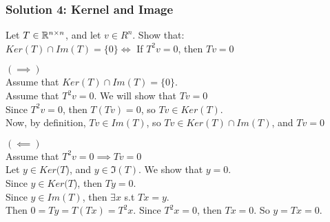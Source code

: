 \documentclass[table]{beamer}
\renewenvironment{enumerate}%
{\begin{list}{\arabic{enumi}.}%
      {\setlength{\leftmargin}{2.5em}%
       \setlength{\itemsep}{-\parsep}%
       \setlength{\topsep}{-\parskip}%
       \usecounter{enumi}}%
 }{\end{list}}
\begin{document}
\begin{frame}
\frametitle{Solution 4: Kernel and Image}
\begin{enumerate}
\item Let $T\in\mathbb{R}^{n\times n}$, and let $v\in R^n$. Show that:\\
$Ker(T)\cap Im(T) = \{0\} \iff $ If $T^2v=0$, then $ Tv=0$\\
\end{enumerate}

\begin{solution}
$(\implies)$ \\
Assume that $Ker(T)\cap Im(T) = \{0\}$.\\
Assume that $T^2v = 0$. We will show that $Tv=0$\\
Since $T^2v = 0$, then $T(Tv)=0$, so $Tv \in Ker(T)$.  \\
Now, by definition, $Tv\in Im(T)$, so $Tv\in Ker(T)\cap Im(T)$, and $Tv =0$

$(\impliedby)$ \\
Assume that $T^2v = 0 \implies Tv=0$\\
Let $y\in Ker(T$), and $y\in \Im(T)$. We show that $y=0$.\\
Since $y\in Ker(T$), then $Ty=0$.\\
Since $y\in Im(T)$, then $\exists x$ s.t $Tx=y$.\\
Then $0=Ty=T(Tx)= T^2x$. Since $T^2x=0$, then $Tx=0$. So $y=Tx=0$.
\end{solution}
\end{frame}
\end{document}
